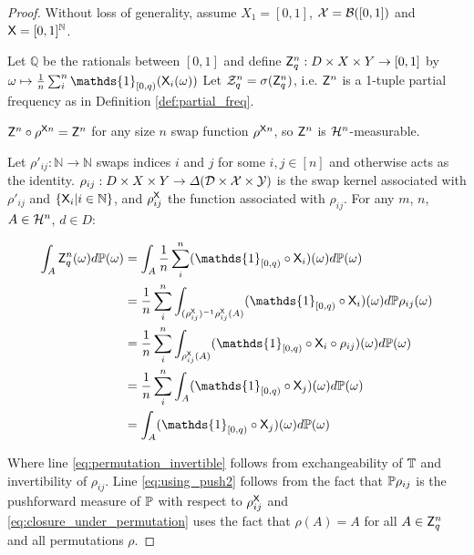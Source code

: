 \begin{proof}
Without loss of generality, assume $X_1=[0,1]$, $\mathcal{X}=\mathcal{B}([0,1])$ and $\mathsf{X}=[0,1]^{\mathbb{N}}$.

Let $\mathbb{Q}$ be the rationals between $[0,1]$ and define $\mathsf{Z}_q^n:D\times X\times Y \to [0,1]$ by $\omega \mapsto \frac{1}{n}\sum_{i}^n \mathds{1}_{[0,q)}(\RV{X}_i(\omega))$ Let $\mathcal{Z}^n_q=\sigma(\mathsf{Z}_q^n)$, i.e. $\mathsf{Z}^n$ is a 1-tuple partial frequency as in Definition \ref{def:partial_freq}.

$\mathsf{Z}^n\circ\rho^{\mathsf{X}n}=\mathsf{Z}^n$ for any size $n$ swap function $\rho^{\mathsf{X}n}$, so $\mathsf{Z}^n$ is $\mathcal{H}^n$-measurable.

Let $\rho'_{ij}:\mathbb{N}\to\mathbb{N}$ swaps indices $i$ and $j$ for some $i,j\in[n]$ and otherwise acts as the identity. $\rho_{ij}:D\times X\times Y\to \Delta(\mathcal{D}\times \mathcal{X}\times \mathcal{Y})$ is the swap kernel associated with $\rho'_{ij}$ and $\{\mathsf{X}_i|i\in \mathbb{N}\}$, and $\rho^{\mathsf{X}}_{ij}$ the function associated with $\rho_{ij}$. For any $m$, $n$, $A\in \mathcal{H}^n$, $d\in D$: 

\begin{align}
    \int_{A} \RV{Z}_q^{n} (\omega) d\prob{P}(\omega) &= \int_{A} \frac{1}{n}\sum_{i}^{n} (\mathds{1}_{[0,q)}\circ \RV{X}_i)(\omega)d\prob{P}(\omega)\\
    &= \frac{1}{n}\sum_{i}^{n} \int_{(\rho^{\RV{X}}_{ij})^{-1}\rho^{\RV{X}}_{ij}(A)} (\mathds{1}_{[0,q)}\circ \RV{X}_i)(\omega)d\prob{P}\rho_{ij}(\omega)\label{eq:permutation_invertible}\\
    &= \frac{1}{n}\sum_{i}^{n} \int_{\rho^{\RV{X}}_{ij}(A)} (\mathds{1}_{[0,q)}\circ \RV{X}_{i}\circ \rho_{ij}) (\omega)d\prob{P}(\omega)\label{eq:using_push2}\\
    &= \frac{1}{n}\sum_{i}^{n} \int_{A} (\mathds{1}_{[0,q)}\circ \RV{X}_{j})(\omega)d\prob{P}(\omega)\label{eq:closure_under_permutation}\\
    &= \int_{A} (\mathds{1}_{[0,q)} \circ \RV{X}_j)(\omega)d\prob{P}(\omega) \label{eq:cond_expectation_first}
\end{align}

Where line \ref{eq:permutation_invertible} follows from exchangeability of $\mathbb{T}$ and invertibility of $\rho_{ij}$. Line \ref{eq:using_push2} follows from the fact that $\mathbb{P}\rho_{ij}$ is the pushforward measure of $\mathbb{P}$ with respect to $\rho^{\mathsf{X}}_{ij}$ and \ref{eq:closure_under_permutation} uses the fact that $\rho(A) = A$ for all $A\in \mathsf{Z}^n_q$ and all permutations $\rho$.


\end{proof}
